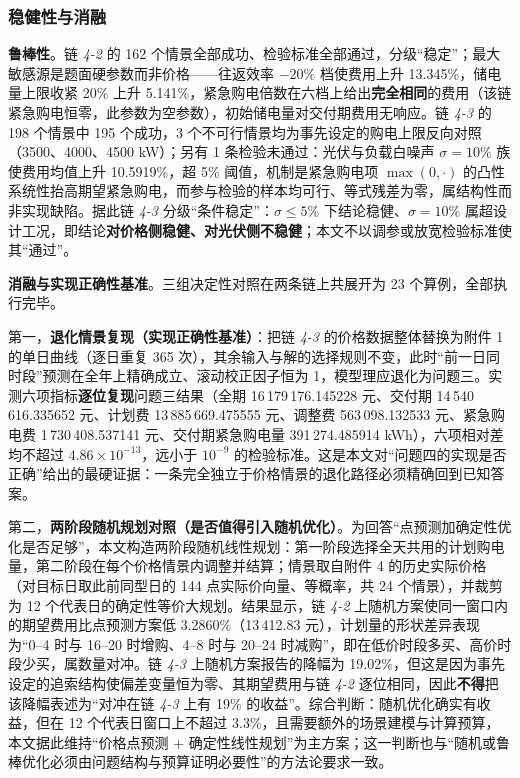 \subsubsection{稳健性与消融}

\textbf{鲁棒性}。链 \emph{4-2} 的 162 个情景全部成功、检验标准全部通过，分级“稳定”；最大敏感源是题面硬参数而非价格——往返效率 $-20\%$ 档使费用上升 13.345\%，储电量上限收紧 20\% 上升 5.141\%，紧急购电倍数在六档上给出\textbf{完全相同}的费用（该链紧急购电恒零，此参数为空参数），初始储电量对交付期费用无响应。链 \emph{4-3} 的 198 个情景中 195 个成功，3 个不可行情景均为事先设定的购电上限反向对照（3500、4000、4500 kW）；另有 1 条检验未通过：光伏与负载白噪声 $\sigma=10\%$ 族使费用均值上升 10.5919\%，超 5\% 阈值，机制是紧急购电项 $\max(0,\cdot)$ 的凸性系统性抬高期望紧急购电，而参与检验的样本均可行、等式残差为零，属结构性而非实现缺陷。据此链 \emph{4-3} 分级“条件稳定”：$\sigma\le5\%$ 下结论稳健、$\sigma=10\%$ 属超设计工况，即结论\textbf{对价格侧稳健、对光伏侧不稳健}；本文不以调参或放宽检验标准使其“通过”。

\textbf{消融与实现正确性基准}。三组决定性对照在两条链上共展开为 23 个算例，全部执行完毕。

第一，\textbf{退化情景复现（实现正确性基准）}：把链 \emph{4-3} 的价格数据整体替换为附件 1 的单日曲线（逐日重复 365 次），其余输入与解的选择规则不变，此时“前一日同时段”预测在全年上精确成立、滚动校正因子恒为 1，模型理应退化为问题三。实测六项指标\textbf{逐位复现}问题三结果（全期 16\,179\,176.145228 元、交付期 14\,540\,616.335652 元、计划费 13\,885\,669.475555 元、调整费 563\,098.132533 元、紧急购电费 1\,730\,408.537141 元、交付期紧急购电量 391\,274.485914 kWh），六项相对差均不超过 $4.86\times10^{-13}$，远小于 $10^{-9}$ 的检验标准。这是本文对“问题四的实现是否正确”给出的最硬证据：一条完全独立于价格情景的退化路径必须精确回到已知答案。

第二，\textbf{两阶段随机规划对照（是否值得引入随机优化）}。为回答“点预测加确定性优化是否足够”，本文构造两阶段随机线性规划：第一阶段选择全天共用的计划购电量，第二阶段在每个价格情景内调整并结算；情景取自附件 4 的历史实际价格（对目标日取此前同型日的 144 点实际价向量、等概率，共 24 个情景），并裁剪为 12 个代表日的确定性等价大规划。结果显示，链 \emph{4-2} 上随机方案使同一窗口内的期望费用比点预测方案低 3.2860\%（13\,412.83 元），计划量的形状差异表现为“0--4 时与 16--20 时增购、4--8 时与 20--24 时减购”，即在低价时段多买、高价时段少买，属数量对冲。链 \emph{4-3} 上随机方案报告的降幅为 19.02\%，但这是因为事先设定的追索结构使偏差变量恒为零、其期望费用与链 \emph{4-2} 逐位相同，因此\textbf{不得}把该降幅表述为“对冲在链 \emph{4-3} 上有 19\% 的收益”。综合判断：随机优化确实有收益，但在 12 个代表日窗口上不超过 3.3\%，且需要额外的场景建模与计算预算，本文据此维持“价格点预测 + 确定性线性规划”为主方案；这一判断也与“随机或鲁棒优化必须由问题结构与预算证明必要性”的方法论要求一致\cite{ref-akbari-2019-stochastic-robust-arbitrage,ref-oconnor-2025-conformal-price-forecast,ref-rawa-2023-mg-stochastic}。

